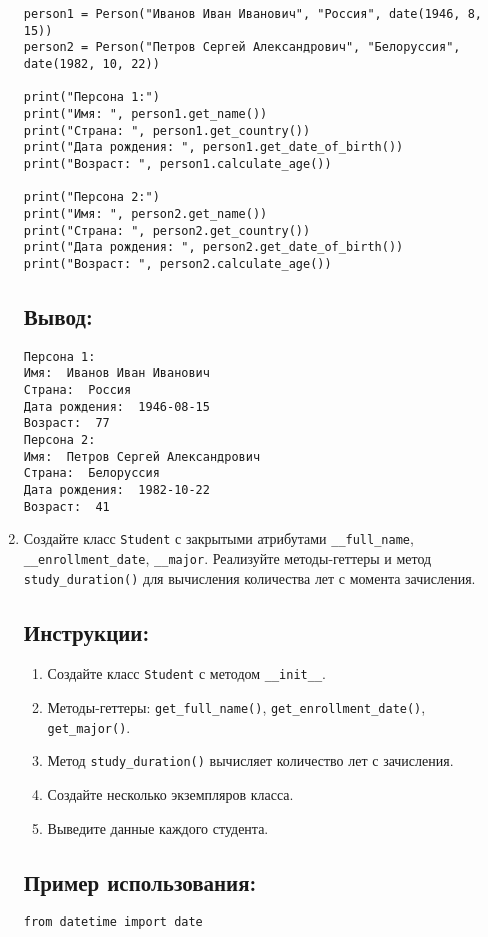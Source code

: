 \begin{enumerate}
\begin{lstlisting}[caption=Пример кода]
person1 = Person("Иванов Иван Иванович", "Россия", date(1946, 8, 15))
person2 = Person("Петров Сергей Александрович", "Белоруссия", date(1982, 10, 22))

print("Персона 1:")
print("Имя: ", person1.get_name())
print("Страна: ", person1.get_country())
print("Дата рождения: ", person1.get_date_of_birth())
print("Возраст: ", person1.calculate_age())

print("Персона 2:")
print("Имя: ", person2.get_name())
print("Страна: ", person2.get_country())
print("Дата рождения: ", person2.get_date_of_birth())
print("Возраст: ", person2.calculate_age())
\end{lstlisting}

\subsection*{Вывод:}
\begin{lstlisting}[caption=Ожидаемый вывод]
Персона 1:
Имя:  Иванов Иван Иванович
Страна:  Россия
Дата рождения:  1946-08-15
Возраст:  77
Персона 2:
Имя:  Петров Сергей Александрович
Страна:  Белоруссия
Дата рождения:  1982-10-22
Возраст:  41
\end{lstlisting}

\item
Создайте класс \texttt{Student} с закрытыми атрибутами \texttt{\_\_full\_name}, \texttt{\_\_enrollment\_date}, \texttt{\_\_major}. Реализуйте методы-геттеры и метод \texttt{study\_duration()} для вычисления количества лет с момента зачисления.

\subsection*{Инструкции:}
\begin{enumerate}
    \item Создайте класс \texttt{Student} с методом \texttt{\_\_init\_\_}.
    \item Методы-геттеры: \texttt{get\_full\_name()}, \texttt{get\_enrollment\_date()}, \texttt{get\_major()}.
    \item Метод \texttt{study\_duration()} вычисляет количество лет с зачисления.
    \item Создайте несколько экземпляров класса.
    \item Выведите данные каждого студента.
\end{enumerate}

\subsection*{Пример использования:}
\begin{lstlisting}[caption=Пример кода]
from datetime import date


\end{lstlisting}
\end{enumerate}
